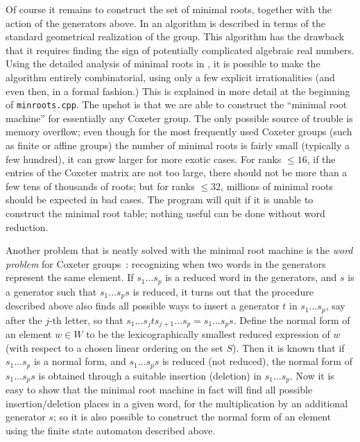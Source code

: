 \documentclass[11pt]{article}
\begin{document}
Of course it remains to construct the set of minimal roots, together with
the action of the generators above. In \cite{brink_howlett:1993} an
algorithm is described in terms of the standard geometrical realization
of the group. This algorithm has the drawback that it requires finding
the sign of potentially complicated algebraic real numbers. Using the
detailed analysis of minimal roots in \cite{brink:1998}, it is possible
to make the algorithm entirely combinatorial, using only a few explicit
irrationalities (and even then, in a formal fashion.) This is explained
in more detail at the beginning of {\tt minroots.cpp}. The upshot is that
we are able to construct the ``minimal root machine'' for essentially any
Coxeter group. The only possible source of trouble is memory overflow; even
though for the most frequently used Coxeter groups (such as finite or affine
groups) the number of minimal roots is fairly small (typically a few hundred),
it can grow larger for more exotic cases. For ranks $\leq 16$, if the
entries of the Coxeter matrix are not too large, there should not be more
than a few tens of thousands of roots; but for ranks $\leq 32$, millions
of minimal roots should be expected in bad cases. The program will quit if it
is unable to construct the minimal root table; nothing useful can be done
without word reduction.

Another problem that is neatly solved with the minimal root machine is the
{\em word problem} for Coxeter groups~: recognizing when two words in the
generators represent the same element. If $s_1\ldots s_p$ is a reduced word
in the generators, and $s$ is a generator such that $s_1\ldots s_ps$ is
reduced, it turns out that the procedure described above also finds all
possible ways to insert a generator $t$ in $s_1\ldots s_p$, say after
the $j$-th letter, so that $s_1\ldots s_jts_{j+1}\ldots s_p=s_1\ldots s_ps$.
Define the normal form of an element $w\in W$ to be the lexicographically
smallest reduced expression of $w$ (with respect to a chosen linear ordering
on the set $S$). Then it is known that if $s_1\ldots s_p$ is a normal form,
and $s_1\ldots s_ps$ is reduced (not reduced), the normal form of
$s_1\ldots s_ps$ is obtained through a suitable insertion (deletion) in
$s_1\ldots s_p$. Now it is easy to show that the minimal root machine in
fact will find all possible insertion/deletion places in a given word,
for the multiplication by an additional generator $s$; so it is also
possible to construct the normal form of an element using the finite state
automaton described above.
\end{document}
